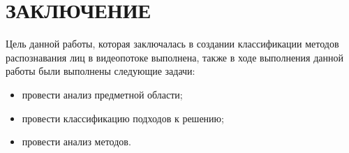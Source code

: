 \chapter*{ЗАКЛЮЧЕНИЕ}


Цель данной работы, которая заключалась в создании классификации методов распознавания лиц в 
видеопотоке выполнена, также в ходе выполнения данной работы были выполнены
следующие задачи:
\begin{itemize}[label=---]
  \item провести анализ предметной области;
  \item провести классификацию подходов к решению;
  \item провести анализ методов.
\end{itemize}

